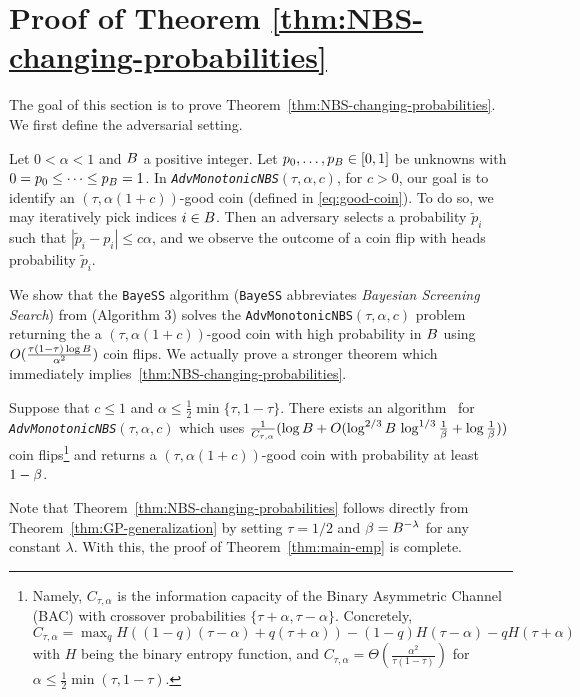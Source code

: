 \section{Proof of Theorem \ref{thm:NBS-changing-probabilities}}
\label{app: proof theorem 3.1} 
 
The goal of this section is to prove Theorem~\ref{thm:NBS-changing-probabilities}. We first define the adversarial setting.
\begin{definition}
\label{def:adversarial}
Let $0<\alpha<1$ and $B$ a positive integer. Let $p_0,\dots,p_B\in [0,1]$ be unknowns with $0=p_0\leq\cdots \leq p_B= 1$. In \emph{\texttt{AdvMonotonicNBS}$(\tau, \alpha, c)$}, for $c>0$, our goal is to identify an $(\tau,\alpha(1+c))$-good coin (defined in \autoref{eq:good-coin}).
To do so, we may iteratively pick indices $i\in B$. Then an adversary selects a probability $\tilde p_i$ such that $| {\tilde{p}}_i - p_i|\leq c\alpha$, and we observe the outcome of a coin flip with heads probability $\tilde p_i$.
\end{definition}
We show that the \texttt{BayeSS} algorithm (\texttt{BayeSS} abbreviates \emph{Bayesian Screening Search}) from \cite{gretta2023sharp}(Algorithm 3) solves the \texttt{AdvMonotonicNBS}$(\tau, \alpha, c)$ problem returning the a $(\tau,\alpha(1+c))$-good coin with high probability in $B$ using
%
$O(\frac{\tau(1-\tau)\log B}{\alpha^2})$ 
 coin flips. We actually prove a stronger theorem which immediately implies~\cref{thm:NBS-changing-probabilities}.

\begin{theorem}\label{thm:GP-generalization}
Suppose that $c\leq 1$ and $\alpha \leq \frac{1}{2}\min\{\tau, 1-\tau\}$. There exists an algorithm~\cite{gretta2023sharp} for \emph{\texttt{AdvMonotonicNBS}$(\tau, \alpha, c)$} which uses 
%
$\tfrac{1}{C_{\tau, \alpha}}(\log B + O(\log^{2/3}B\,\log^{1/3}\frac{1}{\beta}+\log\frac{1}{\beta}))$ 
coin flips\footnote{Namely, $C_{\tau, \alpha}$ is the information capacity of the Binary Asymmetric Channel (BAC) with crossover probabilities $\{\tau + \alpha, \tau - \alpha\}$. Concretely, $C_{\tau, \alpha}=\max_q H((1-q)(\tau-\alpha) + q(\tau+\alpha))-(1-q)H(\tau-\alpha)-qH(\tau+\alpha)$ with $H$ being the binary entropy function, and $C_{\tau,\alpha} = \Theta(\tfrac{\alpha^2}{\tau(1-\tau)})$ for $\alpha \leq \frac{1}{2}\min(\tau, 1-\tau)$.}
%
and returns a $(\tau,\alpha(1+c))$-good coin with probability at least $1-\beta$.
\end{theorem}

Note that Theorem~\ref{thm:NBS-changing-probabilities} follows directly from Theorem~\ref{thm:GP-generalization} by setting $\tau=1/2$ and $\beta=B^{-\lambda}$ for any constant $\lambda$. With this, the proof of Theorem~\ref{thm:main-emp} is complete.

